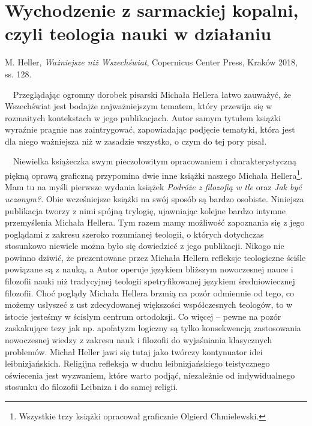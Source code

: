\documentclass[a4paper]{article}
\title{}
\newcommand\textstyleDomylnaczcionkaakapitu[1]{#1}
\begin{document}
\section{Wychodzenie z sarmackiej kopalni, czyli teologia nauki w działaniu}
M. Heller, \textstyleDomylnaczcionkaakapitu{\textit{Ważniejsze niż Wszechświat}}, Copernicus Center Press, Kraków 2018,
ss. 128.

\ \ Przeglądając ogromny dorobek pisarski Michała Hellera łatwo zauważyć, że Wszechświat jest bodajże najważniejszym
tematem, który przewija się w rozmaitych kontekstach w jego publikacjach. Autor samym tytułem książki wyraźnie pragnie
nas zaintrygować, zapowiadając podjęcie tematyki, która jest dla niego ważniejsza niż w zasadzie wszystko, o czym do
tej pory pisał.

\ \ Niewielka książeczka swym pieczołowitym opracowaniem i charakterystyczną piękną oprawą graficzną przypomina dwie
inne książki naszego Michała Hellera\footnote{Wszystkie trzy książki opracował graficznie Olgierd Chmielewski.}. Mam tu
na myśli pierwsze wydania książek \textstyleDomylnaczcionkaakapitu{\textit{Podróże z filozofią w tle }}oraz
\textstyleDomylnaczcionkaakapitu{\textit{Jak być uczonym?}}. Obie wcześniejsze książki na swój sposób są bardzo
osobiste. Niniejsza publikacja tworzy z nimi spójną trylogię, ujawniając kolejne bardzo intymne przemyślenia Michała
Hellera. Tym razem mamy możliwość zapoznania się z jego poglądami z zakresu szeroko rozumianej teologii, o których
dotychczas stosunkowo niewiele można było się dowiedzieć z jego publikacji. Nikogo nie powinno dziwić, że prezentowane
przez Michała Hellera refleksje teologiczne ściśle powiązane są z nauką, a Autor operuje językiem bliższym nowoczesnej
nauce i filozofii nauki niż tradycyjnej teologii spetryfikowanej językiem średniowiecznej filozofii. Choć poglądy
Michała Hellera brzmią na pozór odmiennie od tego, co możemy usłyszeć z ust zdecydowanej większości współczesnych
teologów, to w istocie jesteśmy w ścisłym centrum ortodoksji. Co więcej – pewne na pozór zaskakujące tezy jak np.
apofatyzm logiczny są tylko konsekwencją zastosowania nowoczesnej wiedzy z zakresu nauk i filozofii do wyjaśniania
klasycznych problemów. Michał Heller jawi się tutaj jako twórczy kontynuator idei leibnizjańskich. Religijna refleksja
w duchu leibnizjańskiego teistycznego oświecenia jest wyzwaniem, które warto podjąć, niezależnie od indywidualnego
stosunku do filozofii Leibniza i do samej religii.
\end{document}
